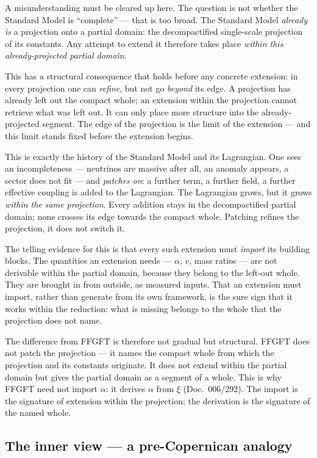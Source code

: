 A misunderstanding must be cleared up here. The question is not whether the
Standard Model is \enquote{complete} --- that is too broad. The Standard Model
\emph{already is} a projection onto a partial domain: the decompactified
single-scale projection of its constants. Any attempt to extend it therefore
takes place \emph{within this already-projected partial domain}.

This has a structural consequence that holds before any concrete extension: in
every projection one can \emph{refine}, but not go \emph{beyond} its edge. A
projection has already left out the compact whole; an extension within the
projection cannot retrieve what was left out. It can only place more structure
into the already-projected segment. The edge of the projection is the limit of
the extension --- and this limit stands fixed before the extension begins.

This is exactly the history of the Standard Model and its Lagrangian. One sees
an incompleteness --- neutrinos are massive after all, an anomaly appears, a
sector does not fit --- and \emph{patches on}: a further term, a further field,
a further effective coupling is added to the Lagrangian. The Lagrangian grows,
but it grows \emph{within the same projection}. Every addition stays in the
decompactified partial domain; none crosses its edge towards the compact whole.
Patching refines the projection, it does not switch it.

The telling evidence for this is that every such extension must \emph{import}
its building blocks. The quantities an extension needs --- $\alpha$, $v$, mass
ratios --- are not derivable within the partial domain, because they belong to
the left-out whole. They are brought in from outside, as measured inputs. That
an extension must import, rather than generate from its own framework, is the
sure sign that it works within the reduction: what is missing belongs to the
whole that the projection does not name.

The difference from FFGFT is therefore not gradual but structural. FFGFT does
not patch the projection --- it names the compact whole from which the
projection and its constants originate. It does not extend within the partial
domain but gives the partial domain as a segment of a whole. This is why FFGFT
need not import $\alpha$: it derives $\alpha$ from $\xi$ (Doc.~006/292). The
import is the signature of extension within the projection; the derivation is
the signature of the named whole.

\subsection*{The inner view --- a pre-Copernican analogy}

